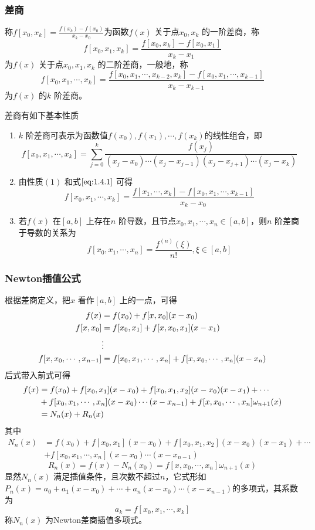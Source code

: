 \documentclass[a4paper]{article}
\begin{document}
\subsubsection{差商}
\begin{definition}
	称$f[x_0, x_k] = \frac{f(x_k) - f(x_{0})}{x_k - x_0}$为函数$f(x)$ 关于点$x_0,x_k$ 的一阶差商，称
	\[
		f[x_0,x_1,x_k] = \frac{f[x_0, x_{k}] - f[x_0,x_1]}{x_{k}-x_1} 
	\] 
	为$f(x)$ 关于点$x_0,x_1,x_{k}$ 的二阶差商，一般地，称
	\[
		f[x_0,x_1,\cdots,x_{k}] = \frac{f[x_0,x_1,\cdots,x_{k-2},x_{k}] - f[x_0, x_1, \cdots, x_{k-1}]}{x_{k} - x_{k-1}} \tag{1.4.1} \label{eq:1.4.1}
	\] 
	为$f(x)$ 的$k$ 阶差商。
\end{definition}
差商有如下基本性质
\begin{enumerate}
	\item $k$ 阶差商可表示为函数值$f(x_0), f(x_1), \cdots, f(x_{k})$的线性组合，即
		\[
			f[x_0,x_1,\cdots,x_{k}] = \sum_{j=0}^{k} \frac{f(x_{j})}{(x_{j}-x_0)\cdots(x_{j}-x_{j-1})(x_{j}-x_{j+1})\cdots(x_{j}-x_{k})} \tag{1.4.2} \label{eq:1.4.2}
		\] 
	\item 由性质$(1)$ 和式$\ref{eq:1.4.1}$ 可得
		\[
			f[x_0, x_1,\cdots,x_{k}] = \frac{f[x_1,\cdots,x_{k}] - f[x_0,x_1,\cdots,x_{k-1}]}{x_{k}-x_0} \tag{1.4.3} \label{eq:1.4.3}
		\] 
	\item 若$f(x)$ 在$[a,b]$ 上存在$n$ 阶导数，且节点$x_0,x_1,\cdots,x_{n} \in [a,b]$，则$n$ 阶差商于导数的关系为
		\[
			f[x_0,x_1,\cdots,x_{n}] = \frac{f^{(n)}(\xi)}{n!}, \xi \in [a,b] \tag{1.4.4} \label{eq:1.4.4}
		\] 
\end{enumerate}
\subsubsection{Newton插值公式}
根据差商定义，把$x$ 看作$[a,b]$ 上的一点，可得
\[
	\begin{aligned}
		f(x) &= f(x_0) + f[x, x_0](x-x_0) \\
		f[x,x_{0}] &= f[x_0,x_1] + f[x, x_0,x_1](x-x_1) \\
		&\vdots \\
		f[x,x_0,\cdots,x_{n-1}] &= f[x_0,x_1,\cdots,x_{n}] + f[x,x_0,\cdots,x_{n}](x-x_{n})
	\end{aligned} \notag
\] 
后式带入前式可得
\[
	\begin{aligned}
		f(x) &= f(x_0) + f[x_0,x_1](x-x_0) + f[x_0,x_1,x_2](x-x_0)(x-x_1)+\cdots \\
		     &+f[x_0,x_1,\cdots,x_{n}](x-x_0)\cdots (x - x_{n-1}) + f[x,x_0,\cdots, x_{n}]\omega_{n+1}(x) \\
		     &=N_n(x) + R_n(x)
	\end{aligned} \notag
\] 
其中
\[
	\tag{1.4.5} \label{eq:1.4.5}
	\begin{aligned}
		N_n(x) &= f(x_0) + f[x_0,x_1](x-x_0) + f[x_0,x_1,x_2](x-x_0)(x-x_1)+\cdots \\
		       &+f[x_0,x_1,\cdots,x_{n}](x-x_0)\cdots (x - x_{n-1}) 
	\end{aligned} 
\] 
\[
	R_n(x) = f(x) - N_n(x_0) = f[x,x_0,\cdots, x_{n}]\omega_{n+1}(x)
\] 
显然$N_n(x)$ 满足插值条件，且次数不超过$n$，它式形如$P_n(x) = a_0 + a_1(x-x_0) + \cdots + a_n(x-x_0)\cdots(x-x_{n-1})$的多项式，其系数为
\[
	a_k = f[x_0,x_1,\cdots,x_{k}]
\] 
称$N_n(x)$ 为Newton差商插值多项式。
\end{document}
